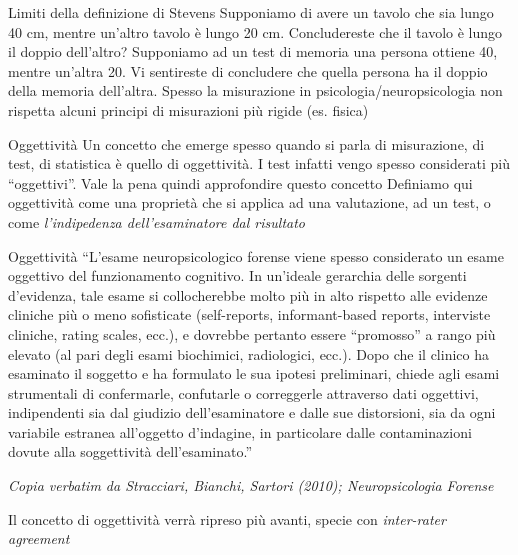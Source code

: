 \documentclass[
  ignorenonframetext,
]{beamer}
\begin{document}
\begin{frame}{Limiti della definizione di Stevens}
\label{limiti-della-definizione-di-stevens-1}
Supponiamo di avere un tavolo che sia lungo 40 cm, mentre un'altro
tavolo è lungo 20 cm. Concludereste che il tavolo è lungo il doppio
dell'altro? \pause \vspace{2em} Supponiamo ad un test di memoria una
persona ottiene 40, mentre un'altra 20. Vi sentireste di concludere che
quella persona ha il doppio della memoria dell'altra. \pause
\vspace{2em} Spesso la misurazione in psicologia/neuropsicologia non
rispetta alcuni principi di misurazioni più rigide (es. fisica)
\end{frame}

\begin{frame}{Oggettività}
\label{oggettivituxe0}
Un concetto che emerge spesso quando si parla di misurazione, di test,
di statistica è quello di oggettività. \pause \vspace{2em} I test
infatti vengo spesso considerati più ``oggettivi''. Vale la pena quindi
approfondire questo concetto \pause \vspace{2em} Definiamo qui
oggettività come una proprietà che si applica ad una valutazione, ad un
test, o come \emph{l'indipedenza dell'esaminatore dal risultato}
\end{frame}

\begin{frame}{Oggettività}
\label{oggettivituxe0-1}
\footnotesize``L'esame neuropsicologico forense viene spesso considerato
un esame oggettivo del funzionamento cognitivo. In un'ideale gerarchia
delle sorgenti d'evidenza, tale esame si collocherebbe molto più in alto
rispetto alle evidenze cliniche più o meno sofisticate (self-reports,
informant-based reports, interviste cliniche, rating scales, ecc.), e
dovrebbe pertanto essere ``promosso'' a rango più elevato (al pari degli
esami biochimici, radiologici, ecc.). Dopo che il clinico ha esaminato
il soggetto e ha formulato le sua ipotesi preliminari, chiede agli esami
strumentali di confermarle, confutarle o correggerle attraverso dati
oggettivi, indipendenti sia dal giudizio dell'esaminatore e dalle sue
distorsioni, sia da ogni variabile estranea all'oggetto d'indagine, in
particolare dalle contaminazioni dovute alla soggettività
dell'esaminato.''

\begin{flushright}
\emph{Copia verbatim da  Stracciari, Bianchi, Sartori (2010); Neuropsicologia Forense}
\end{flushright}

Il concetto di oggettività verrà ripreso più avanti, specie con
\emph{inter-rater agreement}
\end{frame}
\end{document}

